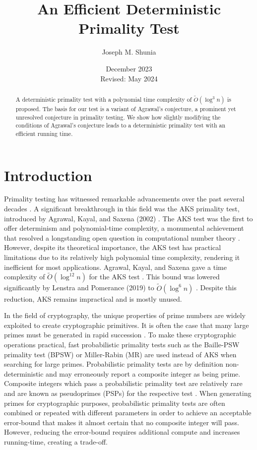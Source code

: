 \documentclass{article}
\title{An Efficient Deterministic Primality Test}
\author{Joseph M. Shunia}
\date{December 2023 \\ \small Revised: May 2024 \normalsize}
\theoremstyle{plain}
\theoremstyle{definition}
\begin{document}
\maketitle

\begin{abstract}
A deterministic primality test with a polynomial time complexity of $\tilde{O}(\log^3 n)$ is proposed. The basis for our test is a variant of Agrawal's conjecture, a prominent yet unresolved conjecture in primality testing. We show how slightly modifying the conditions of Agrawal's conjecture leads to a deterministic primality test with an efficient running time.
\end{abstract}

\section{Introduction}
Primality testing has witnessed remarkable advancements over the past several decades \cite{miller1976, baillie1980, rabin1980, wagstaff1982pseudoprimes, aks2002}. A significant breakthrough in this field was the AKS primality test, introduced by Agrawal, Kayal, and Saxena (2002) \cite{aks2002}. The AKS test was the first to offer determinism and polynomial-time complexity, a monumental achievement that resolved a longstanding open question in computational number theory \cite{goldreich2008}. However, despite its theoretical importance, the AKS test has practical limitations due to its relatively high polynomial time complexity, rendering it inefficient for most applications. Agrawal, Kayal, and Saxena gave a time complexity of $\tilde{O}(\log^{12} n)$ for the AKS test \cite{aks2002}. This bound was lowered significantly by Lenstra and Pomerance (2019) to $\tilde{O}(\log^6 n)$ \cite{lenstra2019gaussian}. Despite this reduction, AKS remains impractical and is mostly unused.

In the field of cryptography, the unique properties of prime numbers are widely exploited to create cryptographic primitives. It is often the case that many large primes must be generated in rapid succession \cite{lenstra1987elliptic}. To make these cryptographic operations practical, fast probabilistic primality tests such as the Baille-PSW primality test (BPSW) \cite{baillie1980} or Miller-Rabin (MR) \cite{rabin1980} \cite{miller1976} are used instead of AKS when searching for large primes. Probabilistic primality tests are by definition non-deterministic and may erroneously report a composite integer as being prime. Composite integers which pass a probabilistic primality test are relatively rare and are known as pseudoprimes (PSPs) for the respective test \cite{wagstaff1982pseudoprimes}. When generating primes for cryptographic purposes, probabilistic primality tests are often combined or repeated with different parameters in order to achieve an acceptable error-bound that makes it almost certain that no composite integer will pass. However, reducing the error-bound requires additional compute and increases running-time, creating a trade-off.
\end{document}
